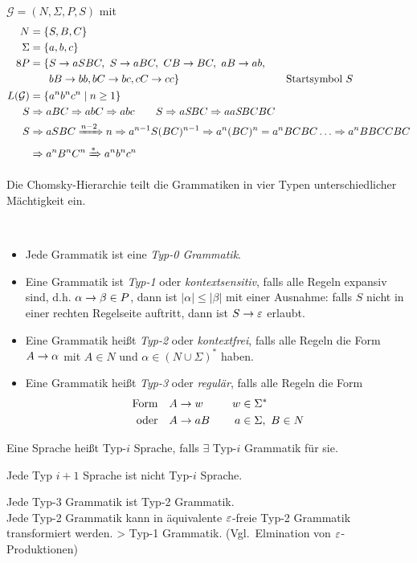 \begin{Bsp} $\mathcal{G}=(N,\Sigma,P,S)$ mit
	\begin{align*}
		N &= \{S,B,C\}\\
		\Sigma &= \{a,b,c\}\\8
		P &= 
		\begin{aligned}[t]
			 \{ &S \-> aSBC,\ S\->aBC,\ CB\-> BC,\ aB\-> ab,\\
			 &bB\-> bb, bC\-> bc, cC\-> cc \} & \quad\text{Startsymbol }S
		\end{aligned}\\
		L(\mathcal{G}) &=  \{ a^nb^nc^n \mid n\geq 1 \}\\
		S &\=> aBC \=> abC \=> abc \qquad S\=>a\emph{S}BC \=> aa\emph{S}BCBC\\
		S &\=> aSBC \xRightarrow{n-2} n \=> a^{n-1}S(BC)^{n-1} \=> a^n(BC)^n = a^nBCBC \dots \=> a^nBBCCBC\\
		&\=> a^nB^nC^n \xRightarrow* a^nb^nc^n
	\end{align*}
\end{Bsp}
Die Chomsky-Hierarchie teilt die Grammatiken in vier Typen unterschiedlicher Mächtigkeit ein.
\begin{Def}\
	\begin{itemize}
	\item Jede Grammatik ist eine \emph{Typ-0 Grammatik}.
	\item Eine Grammatik ist \emph{Typ-1} oder \emph{kontextsensitiv}, falls alle Regeln expansiv sind, d.h. $\alpha\->\beta\in P$, dann ist $|\alpha|\leq |\beta|$ mit einer Ausnahme: falls $S$ nicht in einer rechten Regelseite auftritt, dann ist $S\->\Eps$ erlaubt.
	\item Eine Grammatik heißt \emph{Typ-2} oder \emph{kontextfrei}, falls alle Regeln die Form $A\->\alpha$ mit $A\in N$ und $\alpha\in(N\cup\Sigma)^*$ haben.
	\item Eine Grammatik heißt \emph{Typ-3} oder \emph{regulär}, falls alle Regeln die Form
	\begin{alignat*}{2}
		\text{Form}\quad &A\->w &\quad w&\in\Sigma^*\\
		\text{oder}\quad &A\->aB& a&\in\Sigma,\ B\in N
	\end{alignat*}
	\end{itemize}
	Eine Sprache heißt Typ-$i$ Sprache, falls $\exists$ Typ-$i$ Grammatik für sie.
\end{Def}

\begin{Beobachtung}
	Jede Typ $i+1$ Sprache ist nicht Typ-$i$ Sprache.
\end{Beobachtung}
Jede Typ-3 Grammatik ist Typ-2 Grammatik.\\
Jede Typ-2 Grammatik kann in äquivalente $\varepsilon$-freie Typ-2 Grammatik transformiert werden. \-> Typ-1 Grammatik. (Vgl.\ Elmination von $\varepsilon$-Produktionen)

